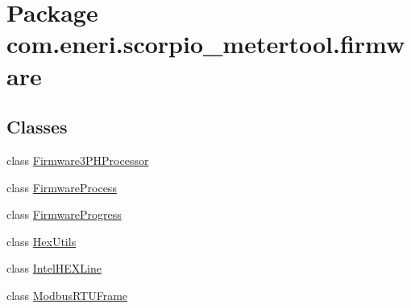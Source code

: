 \hypertarget{namespacecom_1_1eneri_1_1scorpio__metertool_1_1firmware}{}\section{Package com.\+eneri.\+scorpio\+\_\+metertool.\+firmware}
\label{namespacecom_1_1eneri_1_1scorpio__metertool_1_1firmware}
\subsection*{Classes}
\begin{DoxyCompactItemize}
\item 
class \hyperlink{classcom_1_1eneri_1_1scorpio__metertool_1_1firmware_1_1_firmware3_p_h_processor}{Firmware3\+P\+H\+Processor}
\item 
class \hyperlink{classcom_1_1eneri_1_1scorpio__metertool_1_1firmware_1_1_firmware_process}{Firmware\+Process}
\item 
class \hyperlink{classcom_1_1eneri_1_1scorpio__metertool_1_1firmware_1_1_firmware_progress}{Firmware\+Progress}
\item 
class \hyperlink{classcom_1_1eneri_1_1scorpio__metertool_1_1firmware_1_1_hex_utils}{Hex\+Utils}
\item 
class \hyperlink{classcom_1_1eneri_1_1scorpio__metertool_1_1firmware_1_1_intel_h_e_x_line}{Intel\+H\+E\+X\+Line}
\item 
class \hyperlink{classcom_1_1eneri_1_1scorpio__metertool_1_1firmware_1_1_modbus_r_t_u_frame}{Modbus\+R\+T\+U\+Frame}
\end{DoxyCompactItemize}
